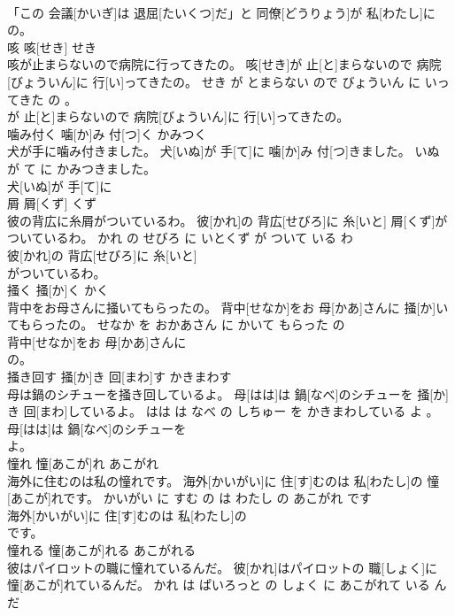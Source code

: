 \documentclass[8pt]{extreport}
\begin{document}
\begin{CJK}{UTF8}{min}
\\	「この 会議[かいぎ]は 退屈[たいくつ]だ」と 同僚[どうりょう]が 私[わたし]に
\\	の。			
\\	咳	咳[せき]	せき	
\\	咳が止まらないので病院に行ってきたの。	咳[せき]が 止[と]まらないので 病院[びょういん]に 行[い]ってきたの。	せき が とまらない ので びょういん に いってきた の 。	
\\	が 止[と]まらないので 病院[びょういん]に 行[い]ってきたの。			
\\	噛み付く	噛[か]み 付[つ]く	かみつく	
\\	犬が手に噛み付きました。	犬[いぬ]が 手[て]に 噛[か]み 付[つ]きました。	いぬ が て に かみつきました。	
\\	犬[いぬ]が 手[て]に
\\	屑	屑[くず]	くず	
\\	彼の背広に糸屑がついているわ。	彼[かれ]の 背広[せびろ]に 糸[いと] 屑[くず]がついているわ。	かれ の せびろ に いとくず が ついて いる わ	
\\	彼[かれ]の 背広[せびろ]に 糸[いと]
\\	がついているわ。			
\\	掻く	掻[か]く	かく	
\\	背中をお母さんに掻いてもらったの。	背中[せなか]をお 母[かあ]さんに 掻[か]いてもらったの。	せなか を おかあさん に かいて もらった の	
\\	背中[せなか]をお 母[かあ]さんに
\\	の。			
\\	掻き回す	掻[か]き 回[まわ]す	かきまわす	
\\	母は鍋のシチューを掻き回しているよ。	母[はは]は 鍋[なべ]のシチューを 掻[か]き 回[まわ]しているよ。	はは は なべ の しちゅー を かきまわしている よ 。	
\\	母[はは]は 鍋[なべ]のシチューを
\\	よ。			
\\	憧れ	憧[あこが]れ	あこがれ	
\\	海外に住むのは私の憧れです。	海外[かいがい]に 住[す]むのは 私[わたし]の 憧[あこが]れです。	かいがい に すむ の は わたし の あこがれ です	
\\	海外[かいがい]に 住[す]むのは 私[わたし]の
\\	です。			
\\	憧れる	憧[あこが]れる	あこがれる	
\\	彼はパイロットの職に憧れているんだ。	彼[かれ]はパイロットの 職[しょく]に 憧[あこが]れているんだ。	かれ は ぱいろっと の しょく に あこがれて いる ん だ	

\end{CJK}
\end{document}

